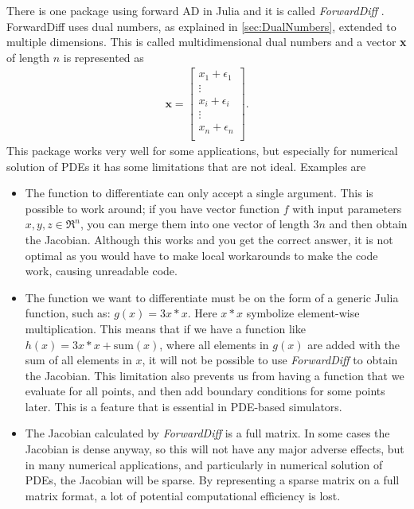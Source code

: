 There is one package using forward AD in Julia and it is called \textit{ForwardDiff} \citep{ForwardDiff}. ForwardDiff uses dual numbers, as explained in \autoref{sec:DualNumbers}, extended to multiple dimensions. This is called multidimensional dual numbers and a vector \textbf{x} of length $n$ is represented as
\begin{align*}
    \textbf{x} = \begin{bmatrix}
    x_1 + \epsilon_1 \\
    \vdots \\
    x_i + \epsilon_i \\
    \vdots \\
    x_n + \epsilon_n \\
    \end{bmatrix}.
\end{align*}
 This package works very well for some applications, but especially for numerical solution of PDEs it has some limitations that are not ideal. Examples are 
\begin{itemize}
    \item The function to differentiate can only accept a single argument. This is possible to work around; if you have vector function $f$ with input parameters $x,y,z \in \Re^n$, you can merge them into one vector of length $3n$ and then obtain the Jacobian. Although this works and you get the correct answer, it is not optimal as you would have to make local workarounds to make the code work, causing unreadable code.
    \item The function we want to differentiate must be on the form of a generic Julia function, such as: $g(x) = 3x*x$. Here $x*x$ symbolize element-wise multiplication. This means that if we have a function like $h(x) = 3x*x + \text{sum}(x)$, where all elements in $g(x)$ are added with the sum of all elements in $x$, it will not be possible to use \textit{ForwardDiff} to obtain the Jacobian. This limitation also prevents us from having a function that we evaluate for all points, and then add boundary conditions for some points later. This is a feature that is essential in PDE-based simulators.
    \item The Jacobian calculated by \textit{ForwardDiff} is a full matrix. In some cases the Jacobian is dense anyway, so this will not have any major adverse effects, but in many numerical applications, and particularly in numerical solution of PDEs, the Jacobian will be sparse. By representing a sparse matrix on a full matrix format, a lot of potential computational efficiency is lost.
\end{itemize}

